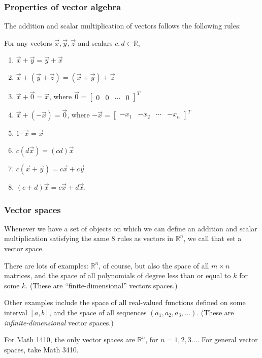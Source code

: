 \documentclass[11pt,t]{beamer}
\newcommand{\R}{\mathbb{R}}
\begin{document}
\begin{frame}
\frametitle{Properties of vector algebra}
The addition and scalar multiplication of vectors follows the following rules:

For any vectors $\vec{x},\vec{y},\vec{z}$ and scalars $c,d\in\R$,
\begin{enumerate}
\item $\vec{x}+\vec{y} = \vec{y}+\vec{x}$
\item $\vec{x}+(\vec{y}+\vec{z}) = (\vec{x}+\vec{y})+\vec{z}$
\item $\vec{x}+\vec{0} = \vec{x}$, where $\vec{0} = \begin{bmatrix}0&0&\cdots&0\end{bmatrix}^T$
\item $\vec{x}+(-\vec{x})=\vec{0}$, where $-\vec{x} = \begin{bmatrix}-x_1&-x_2&\cdots&-x_n\end{bmatrix}^T$
\item $1\cdot\vec{x}=\vec{x}$
\item $c(d\vec{x}) = (cd)\vec{x}$
\item $c(\vec{x}+\vec{y}) = c\vec{x}+c\vec{y}$
\item $(c+d)\vec{x} = c\vec{x}+d\vec{x}$.
\end{enumerate}
\end{frame}
\begin{frame}
\frametitle{Vector spaces}
Whenever we have a set of objects on which we can define an addition and scalar multiplication satisfying the same 8 rules as vectors in $\R^n$, we call that set a \alert{vector space}.

There are lots of examples: $\R^n$, of course, but also the space of all $m\times n$ matrices, and the space of all polynomials of degree less than or equal to $k$ for some $k$. (These are ``finite-dimensional'' vectors spaces.)

Other examples include the space of all real-valued functions defined on some interval $[a,b]$, and the space of all sequences $(a_1,a_2,a_3,\ldots)$. (These are {\em infinite-dimensional} vector spaces.)

\bigskip

For Math 1410, the only vector spaces are $\R^n$, for $n=1,2,3\ldots$. For general vector spaces, take Math 3410.
\end{frame}
\end{document}
